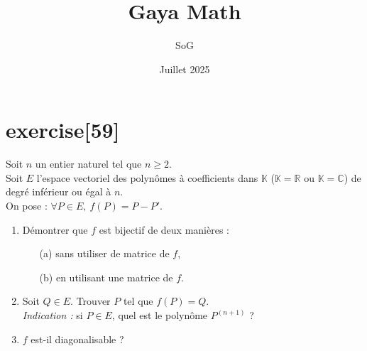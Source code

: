 \documentclass[a4paper,12pt,oneside]{book}
\newenvironment{statement}{\begin{statementbox}}{\end{statementbox}}
\begin{document}
	
	\author{SoG}
	\title{Gaya Math}
	\date{Juillet 2025}
	
	\frontmatter
	\maketitle
	
	\setcounter{tocdepth}{3}
	\setcounter{secnumdepth}{3}
	\tableofcontents
	\label{sec:sommaire}
	
	\mainmatter
	
\section*{exercise[59]}
\begin{statement}
	Soit $n$ un entier naturel tel que $n \geq 2$.\\
	Soit $E$ l’espace vectoriel des polynômes à coefficients dans $\mathbb{K}$ ($\mathbb{K} = \mathbb{R}$ ou $\mathbb{K} = \mathbb{C}$) de degré inférieur ou égal à $n$.\\
	On pose : $\forall P \in E, \ f(P) = P - P'$.
	\begin{enumerate}
		\item Démontrer que $f$ est bijectif de deux manières :
		\begin{itemize}
			\item[(a)] sans utiliser de matrice de $f$,
			\item[(b)] en utilisant une matrice de $f$.
		\end{itemize}
		\item Soit $Q \in E$. Trouver $P$ tel que $f(P) = Q$.\\
		\textit{Indication :} si $P \in E$, quel est le polynôme $P^{(n+1)}$ ?
		\item $f$ est-il diagonalisable ?
	\end{enumerate}
\end{statement}
\end{document}
